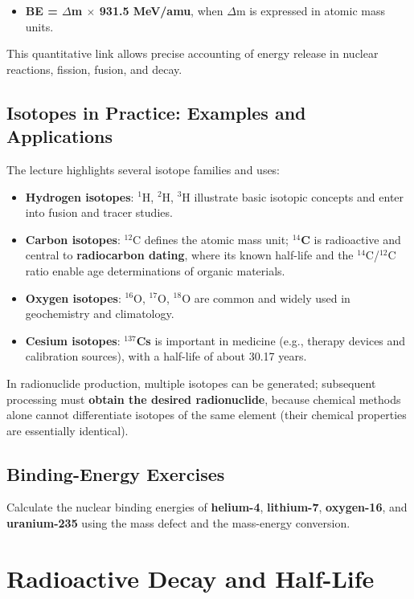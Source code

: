 \documentclass[11pt,a4paper]{article}
\let\originalsection\section
\renewcommand{\section}{\Needspace{7\baselineskip}\originalsection}
\let\originalsubsection\subsection
\renewcommand{\subsection}{\Needspace{8\baselineskip}\originalsubsection}
\begin{document}
\begin{itemize}
\item \textbf{BE = \ensuremath{\Delta}m \ensuremath{\times} 931.5 MeV/amu}, when \ensuremath{\Delta}m is expressed in atomic mass units.
\end{itemize}
This quantitative link allows precise accounting of energy release in nuclear reactions, fission, fusion, and decay.

\subsection{Isotopes in Practice: Examples and Applications}
The lecture highlights several isotope families and uses:

\begin{itemize}
\item \textbf{Hydrogen isotopes}: \ensuremath{{}^{1}}H, \ensuremath{{}^{2}}H, \ensuremath{{}^{3}}H illustrate basic isotopic concepts and enter into fusion and tracer studies.
\item \textbf{Carbon isotopes}: \ensuremath{{}^{12}}C defines the atomic mass unit; \textbf{\ensuremath{{}^{14}}C} is radioactive and central to \textbf{radiocarbon dating}, where its known half-life and the \ensuremath{{}^{14}}C/\ensuremath{{}^{12}}C ratio enable age determinations of organic materials.
\item \textbf{Oxygen isotopes}: \ensuremath{{}^{16}}O, \ensuremath{{}^{17}}O, \ensuremath{{}^{18}}O are common and widely used in geochemistry and climatology.
\item \textbf{Cesium isotopes}: \textbf{\ensuremath{{}^{137}}Cs} is important in medicine (e.g., therapy devices and calibration sources), with a half-life of about 30.17 years.
\end{itemize}
In radionuclide production, multiple isotopes can be generated; subsequent processing must \textbf{obtain the desired radionuclide}, because chemical methods alone cannot differentiate isotopes of the same element (their chemical properties are essentially identical).


\subsection{Binding-Energy Exercises}
Calculate the nuclear binding energies of \textbf{helium-4}, \textbf{lithium-7}, \textbf{oxygen-16}, and \textbf{uranium-235} using the mass defect and the mass-energy conversion.


\clearpage
\section{Radioactive Decay and Half-Life}
\end{document}
